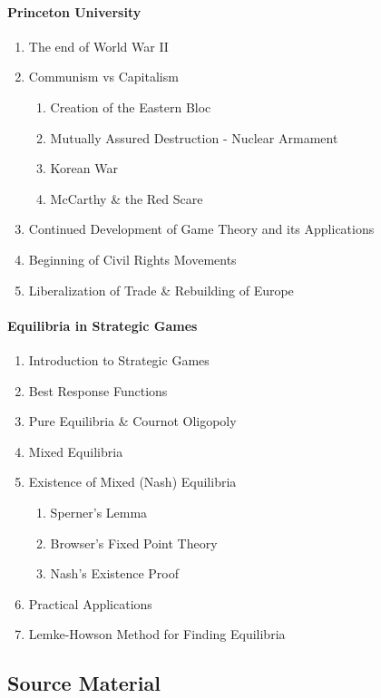 \documentclass[11pt]{article}
\begin{document}
\paragraph{Princeton University}
\begin{enumerate}
	\item The end of World War II
	\item Communism vs Capitalism
	\begin{enumerate}
		\item Creation of the Eastern Bloc
		\item Mutually Assured Destruction - Nuclear Armament
		\item Korean War
		\item McCarthy \& the Red Scare
	\end{enumerate}
	\item Continued Development of Game Theory and its Applications
	\item Beginning of Civil Rights Movements
	\item Liberalization of Trade \& Rebuilding of Europe
\end{enumerate}

\newpage
\paragraph{Equilibria in Strategic Games}
\begin{enumerate}
	\item Introduction to Strategic Games
	\item Best Response Functions
	\item Pure Equilibria \& Cournot Oligopoly
	\item Mixed Equilibria
	\item Existence of Mixed (Nash) Equilibria
	\begin{enumerate}
		\item Sperner's Lemma
		\item Browser's Fixed Point Theory
		\item Nash's Existence Proof
	\end{enumerate}
	\item Practical Applications
	\item Lemke-Howson Method for Finding Equilibria
\end{enumerate}


\subsection*{Source Material}
\end{document}
